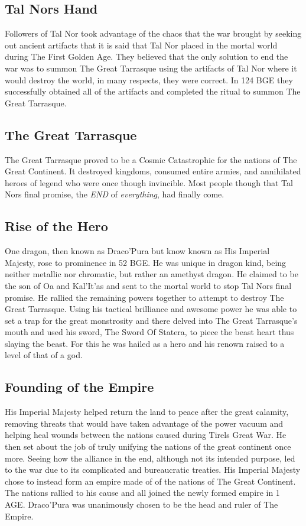 \subsection{Tal Nors Hand}
Followers of Tal Nor took advantage of the chaos that the war brought by seeking out ancient artifacts that it is said that Tal Nor placed in the mortal world during The First Golden Age. They believed that the only solution to end the war was to summon The Great Tarrasque using the artifacts of Tal Nor where it would destroy the world, in many respects, they were correct. In 124 BGE they successfully obtained all of the artifacts and completed the ritual to summon The Great Tarrasque.
\subsection{The Great Tarrasque}
The Great Tarrasque proved to be a Cosmic Catastrophic for the nations of The Great Continent. It destroyed kingdoms, consumed entire armies, and annihilated heroes of legend who were once though invincible. Most people though that Tal Nors final promise, the \textit{END} of \textit{everything}, had finally come.
\subsection{Rise of the Hero}
One dragon, then known as Draco'Pura but know known as His Imperial Majesty, rose to prominence in 52 BGE. He was unique in dragon kind, being neither metallic nor chromatic, but rather an amethyst dragon. He claimed to be the son of Oa and Kal'It'as and sent to the mortal world to stop Tal Nors final promise.\newline
He rallied the remaining powers together to attempt to destroy The Great Tarrasque. Using his tactical brilliance and awesome power he was able to set a trap for the great monstrosity and there delved into The Great Tarrasque's mouth and used his sword, The Sword Of Statera, to piece the beast heart thus slaying the beast.\newline
For this he was hailed as a hero and his renown raised to a level of that of a god.
\subsection{Founding of the Empire}
His Imperial Majesty helped return the land to peace after the great calamity, removing threats that would have taken advantage of the power vacuum and helping heal wounds between the nations caused during Tirels Great War. He then set about the job of truly unifying the nations of the great continent once more.\newline
Seeing how the alliance in the end, although not its intended purpose, led to the war due to its complicated and bureaucratic treaties. His Imperial Majesty chose to instead form an empire made of of the nations of The Great Continent. The nations rallied to his cause and all joined the newly formed empire in 1 AGE. Draco'Pura was unanimously chosen to be the head and ruler of The Empire.
